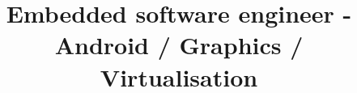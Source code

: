 \documentclass[a4paper, 10pt]{article}
\begin{document}




\begin {identity}
    \name {\personalFirstName}{\personalLastName}
\end {identity}

\title {Embedded software engineer - Android / Graphics / Virtualisation}
\end{document}
